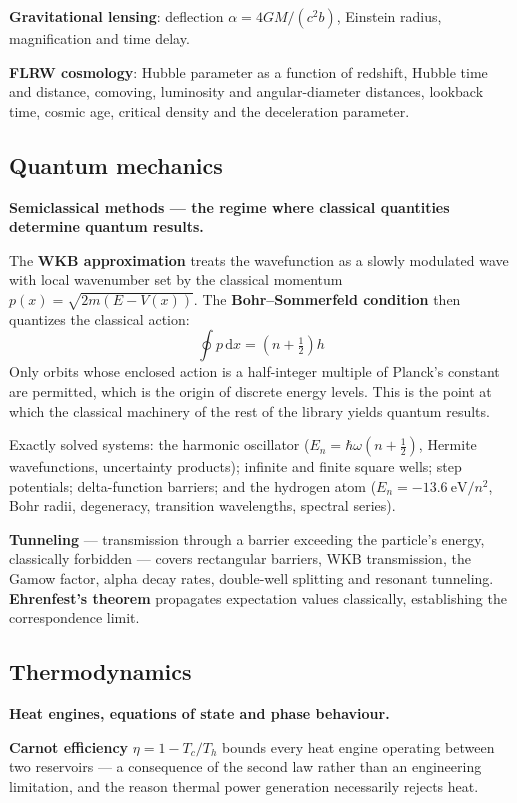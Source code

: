 \documentclass[11pt,a4paper]{article}
\newcommand{\ud}{\mathrm{d}}
\begin{document}
\textbf{Gravitational lensing}: deflection $\alpha = 4GM/(c^2 b)$, Einstein radius, magnification and
time delay.

\textbf{FLRW cosmology}: Hubble parameter as a function of redshift, Hubble time and distance,
comoving, luminosity and angular-diameter distances, lookback time, cosmic age, critical density and
the deceleration parameter.

\subsection{Quantum mechanics}

\textbf{Semiclassical methods --- the regime where classical quantities determine quantum results.}

The \textbf{WKB approximation} treats the wavefunction as a slowly modulated wave with local
wavenumber set by the classical momentum $p(x) = \sqrt{2m(E - V(x))}$. The \textbf{Bohr--Sommerfeld
condition} then quantizes the classical action:
\begin{equation}
\oint p\,\ud x = \left(n + \tfrac{1}{2}\right)h
\end{equation}
Only orbits whose enclosed action is a half-integer multiple of Planck's constant are permitted,
which is the origin of discrete energy levels. This is the point at which the classical machinery of
the rest of the library yields quantum results.

Exactly solved systems: the harmonic oscillator ($E_n = \hbar\omega(n + \tfrac{1}{2})$, Hermite
wavefunctions, uncertainty products); infinite and finite square wells; step potentials;
delta-function barriers; and the hydrogen atom ($E_n = -13.6\ \mathrm{eV}/n^2$, Bohr radii,
degeneracy, transition wavelengths, spectral series).

\textbf{Tunneling} --- transmission through a barrier exceeding the particle's energy, classically
forbidden --- covers rectangular barriers, WKB transmission, the Gamow factor, alpha decay rates,
double-well splitting and resonant tunneling. \textbf{Ehrenfest's theorem} propagates expectation
values classically, establishing the correspondence limit.

\subsection{Thermodynamics}

\textbf{Heat engines, equations of state and phase behaviour.}

\textbf{Carnot efficiency} $\eta = 1 - T_c/T_h$ bounds every heat engine operating between two
reservoirs --- a consequence of the second law rather than an engineering limitation, and the reason
thermal power generation necessarily rejects heat.
\end{document}
